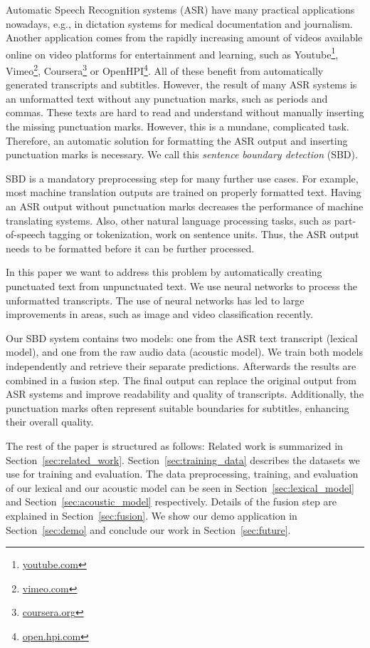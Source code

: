 Automatic Speech Recognition systems (ASR) have many practical applications nowadays, e.g., in dictation systems for medical documentation and journalism.
Another application comes from the rapidly increasing amount of videos available online on video platforms for entertainment and learning, such as Youtube\footnote{\url{youtube.com}}, Vimeo\footnote{\url{vimeo.com}}, Coursera\footnote{\url{coursera.org}} or OpenHPI\footnote{\url{open.hpi.com}}.
All of these benefit from automatically generated transcripts and subtitles.
However, the result of many ASR systems is an unformatted text without any punctuation marks, such as periods and commas.
These texts are hard to read and understand without manually inserting the missing punctuation marks.
However, this is a mundane, complicated task.
Therefore, an automatic solution for formatting the ASR output and inserting punctuation marks is necessary.
We call this \emph{sentence boundary detection} (SBD).

SBD is a mandatory preprocessing step for many further use cases.
For example, most machine translation outputs are trained on properly formatted text.
Having an ASR output without punctuation marks decreases the performance of machine translating systems.
Also, other natural language processing tasks, such as part-of-speech tagging or tokenization, work on sentence units.
Thus, the ASR output needs to be formatted before it can be further processed.

In this paper we want to address this problem by automatically creating punctuated text from unpunctuated text.
We use neural networks to process the unformatted transcripts.
The use of neural networks has led to large improvements in areas, such as image and video classification recently.

Our SBD system contains two models: one from the ASR text transcript (lexical model), and one from the raw audio data (acoustic model).
We train both models independently and retrieve their separate predictions.
Afterwards the results are combined in a fusion step.
The final output can replace the original output from ASR systems and improve readability and quality of transcripts.
Additionally, the punctuation marks often represent suitable boundaries for subtitles, enhancing their overall quality.

The rest of the paper is structured as follows:
Related work is summarized in Section~\ref{sec:related_work}.
Section~\ref{sec:training_data} describes the datasets we use for training and evaluation.
The data preprocessing, training, and evaluation of our lexical and our acoustic model can be seen in Section~\ref{sec:lexical_model} and Section~\ref{sec:acoustic_model} respectively.
Details of the fusion step are explained in Section~\ref{sec:fusion}.
We show our demo application in Section~\ref{sec:demo} and conclude our work in Section~\ref{sec:future}.